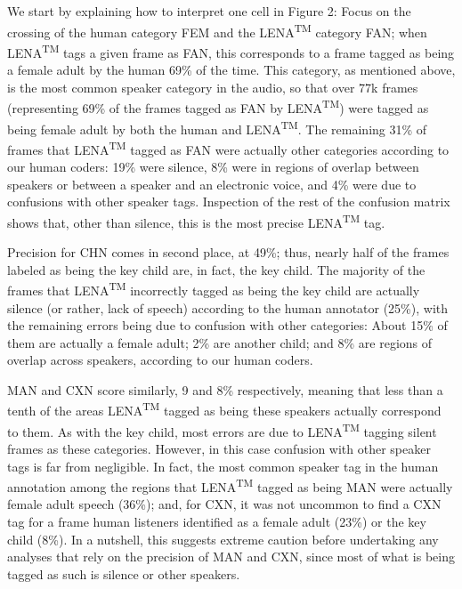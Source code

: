 \documentclass[english,table,man,floatsintext]{apa6}
\begin{document}
We start by explaining how to interpret one cell in Figure 2: Focus on the crossing of the human category FEM and the LENA\textsuperscript{TM} category FAN; when LENA\textsuperscript{TM} tags a given frame as FAN, this corresponds to a frame tagged as being a female adult by the human 69\% of the time. This category, as mentioned above, is the most common speaker category in the audio, so that over 77k frames (representing 69\% of the frames tagged as FAN by LENA\textsuperscript{TM}) were tagged as being female adult by both the human and LENA\textsuperscript{TM}. The remaining 31\% of frames that LENA\textsuperscript{TM} tagged as FAN were actually other categories according to our human coders: 19\% were silence, 8\% were in regions of overlap between speakers or between a speaker and an electronic voice, and 4\% were due to confusions with other speaker tags. Inspection of the rest of the confusion matrix shows that, other than silence, this is the most precise LENA\textsuperscript{TM} tag.

Precision for CHN comes in second place, at 49\%; thus, nearly half of the frames labeled as being the key child are, in fact, the key child. The majority of the frames that LENA\textsuperscript{TM} incorrectly tagged as being the key child are actually silence (or rather, lack of speech) according to the human annotator (25\%), with the remaining errors being due to confusion with other categories: About 15\% of them are actually a female adult; 2\% are another child; and 8\% are regions of overlap across speakers, according to our human coders.

MAN and CXN score similarly, 9 and 8\% respectively, meaning that less than a tenth of the areas LENA\textsuperscript{TM} tagged as being these speakers actually correspond to them. As with the key child, most errors are due to LENA\textsuperscript{TM} tagging silent frames as these categories. However, in this case confusion with other speaker tags is far from negligible. In fact, the most common speaker tag in the human annotation among the regions that LENA\textsuperscript{TM} tagged as being MAN were actually female adult speech (36\%); and, for CXN, it was not uncommon to find a CXN tag for a frame human listeners identified as a female adult (23\%) or the key child (8\%). In a nutshell, this suggests extreme caution before undertaking any analyses that rely on the precision of MAN and CXN, since most of what is being tagged as such is silence or other speakers.
\end{document}

